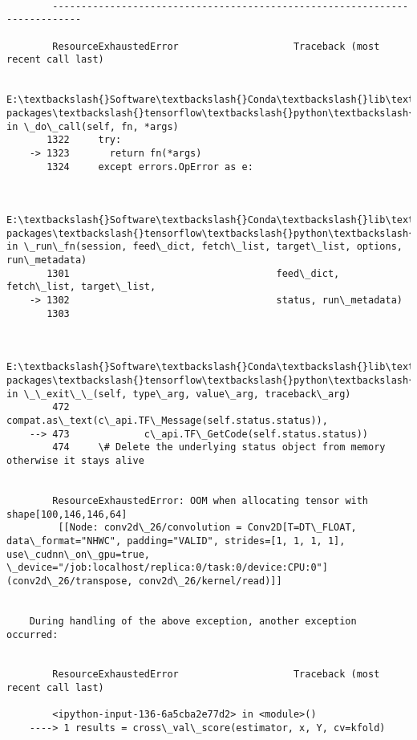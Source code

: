 \documentclass[11pt]{article}
\begin{document}
    \begin{Verbatim}[commandchars=\\\{\}]

        ---------------------------------------------------------------------------

        ResourceExhaustedError                    Traceback (most recent call last)

        E:\textbackslash{}Software\textbackslash{}Conda\textbackslash{}lib\textbackslash{}site-packages\textbackslash{}tensorflow\textbackslash{}python\textbackslash{}client\textbackslash{}session.py in \_do\_call(self, fn, *args)
       1322     try:
    -> 1323       return fn(*args)
       1324     except errors.OpError as e:
    

        E:\textbackslash{}Software\textbackslash{}Conda\textbackslash{}lib\textbackslash{}site-packages\textbackslash{}tensorflow\textbackslash{}python\textbackslash{}client\textbackslash{}session.py in \_run\_fn(session, feed\_dict, fetch\_list, target\_list, options, run\_metadata)
       1301                                    feed\_dict, fetch\_list, target\_list,
    -> 1302                                    status, run\_metadata)
       1303 
    

        E:\textbackslash{}Software\textbackslash{}Conda\textbackslash{}lib\textbackslash{}site-packages\textbackslash{}tensorflow\textbackslash{}python\textbackslash{}framework\textbackslash{}errors\_impl.py in \_\_exit\_\_(self, type\_arg, value\_arg, traceback\_arg)
        472             compat.as\_text(c\_api.TF\_Message(self.status.status)),
    --> 473             c\_api.TF\_GetCode(self.status.status))
        474     \# Delete the underlying status object from memory otherwise it stays alive
    

        ResourceExhaustedError: OOM when allocating tensor with shape[100,146,146,64]
    	 [[Node: conv2d\_26/convolution = Conv2D[T=DT\_FLOAT, data\_format="NHWC", padding="VALID", strides=[1, 1, 1, 1], use\_cudnn\_on\_gpu=true, \_device="/job:localhost/replica:0/task:0/device:CPU:0"](conv2d\_26/transpose, conv2d\_26/kernel/read)]]

        
    During handling of the above exception, another exception occurred:
    

        ResourceExhaustedError                    Traceback (most recent call last)

        <ipython-input-136-6a5cba2e77d2> in <module>()
    ----> 1 results = cross\_val\_score(estimator, x, Y, cv=kfold)
    


\end{Verbatim}
\end{document}
